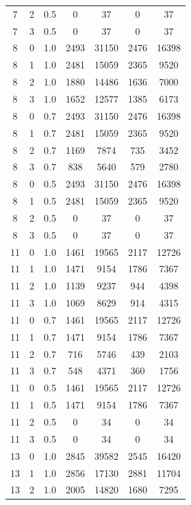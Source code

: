 \documentclass[conference,twoside]{IEEEtran}
\begin{document}
\begin{table}
\begin{longtable}{c c c S S S S}
        7 & 2 & 0.5 & 0 & 37 & 0 & 37 \\
        7 & 3 & 0.5 & 0 & 37 & 0 & 37 \\
        8 & 0 & 1.0 & 2493 & 31150 & 2476 & 16398 \\
        8 & 1 & 1.0 & 2481 & 15059 & 2365 & 9520 \\
        8 & 2 & 1.0 & 1880 & 14486 & 1636 & 7000 \\
        8 & 3 & 1.0 & 1652 & 12577 & 1385 & 6173 \\
        8 & 0 & 0.7 & 2493 & 31150 & 2476 & 16398 \\
        8 & 1 & 0.7 & 2481 & 15059 & 2365 & 9520 \\
        8 & 2 & 0.7 & 1169 & 7874 & 735 & 3452 \\
        8 & 3 & 0.7 & 838 & 5640 & 579 & 2780 \\
        8 & 0 & 0.5 & 2493 & 31150 & 2476 & 16398 \\
        8 & 1 & 0.5 & 2481 & 15059 & 2365 & 9520 \\
        8 & 2 & 0.5 & 0 & 37 & 0 & 37 \\
        8 & 3 & 0.5 & 0 & 37 & 0 & 37 \\
        11 & 0 & 1.0 & 1461 & 19565 & 2117 & 12726 \\
        11 & 1 & 1.0 & 1471 & 9154 & 1786 & 7367 \\
        11 & 2 & 1.0 & 1139 & 9237 & 944 & 4398 \\
        11 & 3 & 1.0 & 1069 & 8629 & 914 & 4315 \\
        11 & 0 & 0.7 & 1461 & 19565 & 2117 & 12726 \\
        11 & 1 & 0.7 & 1471 & 9154 & 1786 & 7367 \\
        11 & 2 & 0.7 & 716 & 5746 & 439 & 2103 \\
        11 & 3 & 0.7 & 548 & 4371 & 360 & 1756 \\
        11 & 0 & 0.5 & 1461 & 19565 & 2117 & 12726 \\
        11 & 1 & 0.5 & 1471 & 9154 & 1786 & 7367 \\
        11 & 2 & 0.5 & 0 & 34 & 0 & 34 \\
        11 & 3 & 0.5 & 0 & 34 & 0 & 34 \\
        13 & 0 & 1.0 & 2845 & 39582 & 2545 & 16420 \\
        13 & 1 & 1.0 & 2856 & 17130 & 2881 & 11704 \\
        13 & 2 & 1.0 & 2005 & 14820 & 1680 & 7295 \\

\end{longtable}
\end{table}
\end{document}
